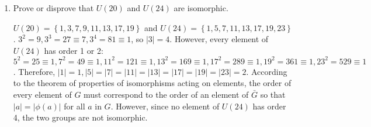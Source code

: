 \documentclass{article}
\begin{document}
\begin{enumerate}
\begin{flushleft}
    \end{flushleft}
    \item Prove or disprove that $U(20)$ and $U(24)$ are isomorphic.
    \begin{flushleft}
    $U(20) = \left\{1, 3, 7, 9, 11, 13, 17, 19\right \}$ and $U(24) = \left\{1, 5, 7, 11, 13, 17, 19, 23\right\}$. $3^2=9, 3^3=27 \equiv 7, 3^4 = 81 \equiv 1$, so $|3| = 4$. However, every element of $U(24)$ has order 1 or 2: $5^2 = 25 \equiv 1, 7^2 = 49 \equiv 1, 11^2 = 121 \equiv 1, 13^2 = 169 \equiv 1, 17^2 = 289 \equiv 1, 19^2 = 361 \equiv 1, 23^2 = 529 \equiv 1$. Therefore, $|1| = 1, |5| = |7| = |11| = |13| = |17| = |19| = |23| = 2$. According to the theorem of properties of isomorphisms acting on elements, the order of every element of $G$ must correspond to the order of an element of $\bar{G}$ so that $|a| = |\phi(a)|$ for all $a$ in $G$. However, since no element of $U(24)$ has order 4, the two groups are not isomorphic.


\end{flushleft}
\end{enumerate}
\end{document}
